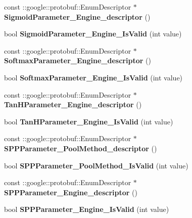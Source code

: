 \begin{DoxyCompactItemize}
const \+::google\+::protobuf\+::\+Enum\+Descriptor $\ast$ {\bfseries Sigmoid\+Parameter\+\_\+\+Engine\+\_\+descriptor} ()
\item 
\mbox{\label{namespacecaffe_aeaf84bc5bb256436536b26e566cc1463}} 
bool {\bfseries Sigmoid\+Parameter\+\_\+\+Engine\+\_\+\+Is\+Valid} (int value)
\item 
\mbox{\label{namespacecaffe_a3692a3928f35e6237cba31bfc9d61ff9}} 
const \+::google\+::protobuf\+::\+Enum\+Descriptor $\ast$ {\bfseries Softmax\+Parameter\+\_\+\+Engine\+\_\+descriptor} ()
\item 
\mbox{\label{namespacecaffe_acf1a8af75d7432b5bc00262d0c2f2af1}} 
bool {\bfseries Softmax\+Parameter\+\_\+\+Engine\+\_\+\+Is\+Valid} (int value)
\item 
\mbox{\label{namespacecaffe_a28db430d5c9f233d4e25be261be75cc9}} 
const \+::google\+::protobuf\+::\+Enum\+Descriptor $\ast$ {\bfseries Tan\+H\+Parameter\+\_\+\+Engine\+\_\+descriptor} ()
\item 
\mbox{\label{namespacecaffe_a7cecf90e70f33dc82c82ab6a1cc95d85}} 
bool {\bfseries Tan\+H\+Parameter\+\_\+\+Engine\+\_\+\+Is\+Valid} (int value)
\item 
\mbox{\label{namespacecaffe_accb3c441805e0e3cd16868a38914acc5}} 
const \+::google\+::protobuf\+::\+Enum\+Descriptor $\ast$ {\bfseries S\+P\+P\+Parameter\+\_\+\+Pool\+Method\+\_\+descriptor} ()
\item 
\mbox{\label{namespacecaffe_a95c23aaed6db75c7a8c30eb8b20aca1d}} 
bool {\bfseries S\+P\+P\+Parameter\+\_\+\+Pool\+Method\+\_\+\+Is\+Valid} (int value)
\item 
\mbox{\label{namespacecaffe_ad45b7cbbe96da9cc6760f4ed70078a5e}} 
const \+::google\+::protobuf\+::\+Enum\+Descriptor $\ast$ {\bfseries S\+P\+P\+Parameter\+\_\+\+Engine\+\_\+descriptor} ()
\item 
\mbox{\label{namespacecaffe_a49d69f5c04d7725107cc298f0207eba7}} 
bool {\bfseries S\+P\+P\+Parameter\+\_\+\+Engine\+\_\+\+Is\+Valid} (int value)
\item 

\end{DoxyCompactItemize}
